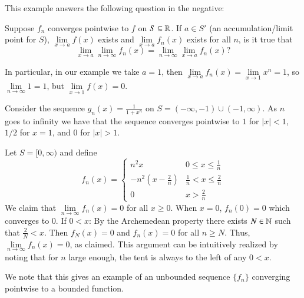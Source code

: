 This example answers the following question in the negative:

\begin{question}[Question]
    Suppose $f_n$ converges pointwise to $f$ on $S \subseteq \mathbb R$. If $a \in S'$ (an accumulation/limit point for $S$), $\lim\limits_{x\rightarrow a}f(x)$ exists and $\lim\limits_{x\rightarrow a}f_n(x)$ exists for all $n$, is it true that \begin{equation*}
        \lim\limits_{x\rightarrow a}\lim\limits_{n\rightarrow \infty}f_n(x) = \lim\limits_{n\rightarrow \infty}\lim\limits_{x\rightarrow a}f_n(x)?
    \end{equation*}
\end{question}

In particular, in our example we take $a = 1$, then $\lim\limits_{x\rightarrow a}f_n(x) = \lim\limits_{x\rightarrow 1}x^n = 1$, so $\lim\limits_{n\rightarrow \infty}1 = 1$, but $\lim\limits_{x\rightarrow 1}f(x) = 0$.


\begin{example}
    Consider the sequence $g_n(x) = \frac{1}{1+x^n}$ on $S = (-\infty,-1)\cup(-1,\infty)$. As $n$ goes to infinity we have that the sequence converges pointwise to $1$ for $|x| < 1$, $1/2$ for $x = 1$, and $0$ for $|x| > 1$.
\end{example}

\begin{example}
    Let $S = [0,\infty)$ and define \begin{equation*}
        f_n(x) = \left\{\begin{array}{lc} n^2x & 0 \leq x \leq \frac{1}{n} \\ -n^2\left(x-\frac{2}{n}\right) & \frac{1}{n} < x \leq \frac{2}{n} \\ 0 & x > \frac{2}{n}\end{array}\right.
    \end{equation*}
    We claim that $\lim\limits_{n\rightarrow \infty}f_n(x) = 0$ for all $x \geq 0$. When $x=0$, $f_n(0) = 0$ which converges to $0$. If $0 < x$: By the Archemedean property there exists $N \in \mathbb N$ such that $\frac{2}{N} < x$. Then $f_N(x) = 0$ and $f_n(x) = 0$ for all $n \geq N$. Thus, $\lim\limits_{n\rightarrow \infty}f_n(x) = 0$, as claimed. This argument can be intuitively realized by noting that for $n$ large enough, the tent is always to the left of any $0 < x$.
\end{example}

We note that this gives an example of an unbounded sequence $\{f_n\}$ converging pointwise to a bounded function.

